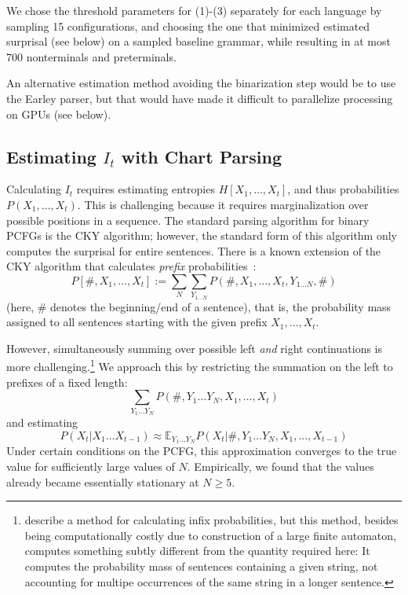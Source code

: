 \documentclass[11pt,letterpaper]{article}
\newcommand{\E}[0]{\mathbb{E}}
\begin{document}
We chose the threshold parameters for (1)-(3) separately for each language by sampling 15 configurations, and choosing the one that minimized estimated surprisal (see below) on a sampled baseline grammar, while resulting in at most 700 nonterminals and preterminals.

An alternative estimation method avoiding the binarization step would be to use the Earley parser, but that would have made it difficult to parallelize processing on GPUs (see below).

\subsection{Estimating $I_t$ with Chart Parsing}

Calculating $I_t$ requires estimating entropies $H[X_1, \dots, X_t]$, and thus probabilities $P(X_1, \dots, X_t)$.
This is challenging because it requires marginalization over possible positions in a sequence.
The standard parsing algorithm for binary PCFGs is the CKY algorithm; however, the standard form of this algorithm only computes the surprisal for entire sentences.
There is a known extension of the CKY algorithm that calculates \emph{prefix} probabilities~\citep{DBLP:journals/coling/JelinekL91,DBLP:journals/coling/Stolcke95,DBLP:journals/coling/Goodman99}:
\begin{equation}
P[\#, X_1, \dots, X_t] := \sum_N \sum_{Y_{1\dots N}} P(\#, X_1, \dots, X_t, Y_{1\dots N}, \#)
\end{equation}
(here, $\#$ denotes the beginning/end of a sentence), that is, the probability mass assigned to all sentences starting with the given prefix $X_1, \dots, X_t$.

However, simultaneously summing over possible left \emph{and} right continuations is more challenging.\footnote{\citet{DBLP:conf/emnlp/NederhofS11} describe a method for calculating infix probabilities, but this method, besides being computationally costly due to construction of a large finite automaton, computes something subtly different from the quantity required here: It computes the probability mass of sentences containing a given string, not accounting for multipe occurrences of the same string in a longer sentence.}
We approach this by restricting the summation on the left to prefixes of a fixed length:
\begin{equation}
    \sum_{Y_1\dots Y_N} P(\#, Y_1 \dots Y_N, X_1, \dots, X_t)
\end{equation}
and estimating
\begin{equation}
    P(X_t|X_1\dots X_{t-1}) \approx \E_{Y_1\dots Y_N} P(X_t|\#, Y_1 \dots Y_N, X_1, \dots, X_{t-1})
\end{equation}
Under certain conditions on the PCFG, this approximation converges to the true value for sufficiently large values of $N$.
Empirically, we found that the values already became essentially stationary at $N\geq 5$.
\end{document}
